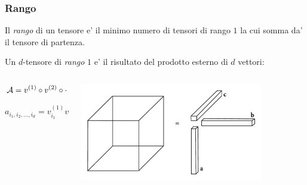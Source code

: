 \documentclass{beamer}
\theoremstyle{definition}
\theoremstyle{plain}
\begin{document}
\begin{frame}
\frametitle{Rango}
Il \emph{rango} di un tensore e' il minimo numero di tensori di rango $1$ la cui somma da' il tensore di partenza.

\vspace{5mm}
Un $d$-tensore di \emph{rango} $1$ e' il risultato del prodotto esterno di $d$ vettori:

\begin{columns}
\begin{column}{0.5\textwidth}
\begin{equation*}
  \mathcal{A} = v^{(1)} \circ v^{(2)} \circ \cdots \circ v^{(d)}
\end{equation*}

\begin{equation*}
  a_{i_1,i_2,\ldots,i_d} = v_{i_1}^{(1)} v_{i_2}^{(2)} \cdots v_{i_d}^{(d)}
\end{equation*}
\end{column}

\begin{column}{0.5\textwidth}
\begin{center}
	\includegraphics[width=0.8\textwidth]{Img/rank_one_tensor.jpg}
\end{center}
\end{column}
\end{columns}
\end{frame}

\end{document}
